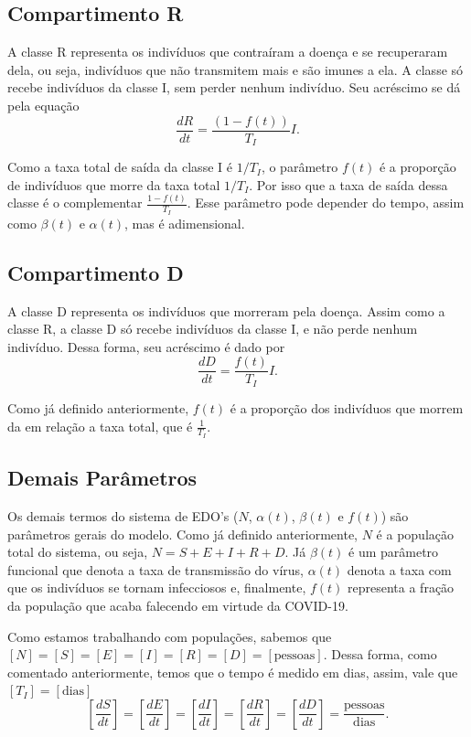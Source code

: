 \documentclass{article}
\begin{document}
\subsection*{Compartimento R}

A classe R representa os indivíduos que contraíram a doença e se recuperaram dela, ou seja, indivíduos que não transmitem mais e são imunes a ela. A classe só recebe indivíduos da classe I, sem perder nenhum indivíduo. Seu acréscimo se dá pela equação
\[\dfrac{dR}{dt} = \dfrac{(1 - f(t))}{T_I}I.\]

Como a taxa total de saída da classe I é $1/T_I$, o parâmetro $f(t)$ é a proporção de indivíduos que morre da taxa total $1/T_I$. Por isso que a taxa de saída dessa classe é o complementar $\frac{1 - f(t)}{T_I}$. Esse parâmetro pode depender do tempo, assim como $\beta(t)$ e $\alpha(t)$, mas é adimensional.

\subsection*{Compartimento D}

A classe D representa os indivíduos que morreram pela doença. Assim como a classe R, a classe D só recebe indivíduos da classe I, e não perde nenhum indivíduo. Dessa forma, seu acréscimo é dado por
\[\dfrac{dD}{dt} = \dfrac{f(t)}{T_I}I.\]

Como já definido anteriormente, $f(t)$ é a proporção dos indivíduos que morrem da em relação a taxa total, que é $\frac{1}{T_I}$. 

\subsection*{Demais Parâmetros}

Os demais termos do sistema de EDO's ($N$, $\alpha(t)$, $\beta(t)$ e $f(t)$) são parâmetros gerais do modelo. Como já definido anteriormente, $N$ é a população total do sistema, ou seja, $N = S + E + I + R + D$. Já $\beta(t)$ é um parâmetro funcional que denota a taxa de transmissão do vírus, $\alpha(t)$ denota a taxa com que os indivíduos se tornam infecciosos e, finalmente, $f(t)$ representa a fração da população que acaba falecendo em virtude da COVID-19.

Como estamos trabalhando com populações, sabemos que $[N] = [S] = [E] = [I] = [R] = [D] = [\text{pessoas}]$. Dessa forma, como comentado anteriormente, temos que o tempo é medido em dias, assim, vale que $[T_I] = [\text{dias}]$
\[\left[\dfrac{dS}{dt}\right] = \left[\dfrac{dE}{dt}\right] = \left[\dfrac{dI}{dt}\right] = \left[\dfrac{dR}{dt}\right] = \left[\dfrac{dD}{dt}\right] = \dfrac{\text{pessoas}}{\text{dias}}.\]
\end{document}
